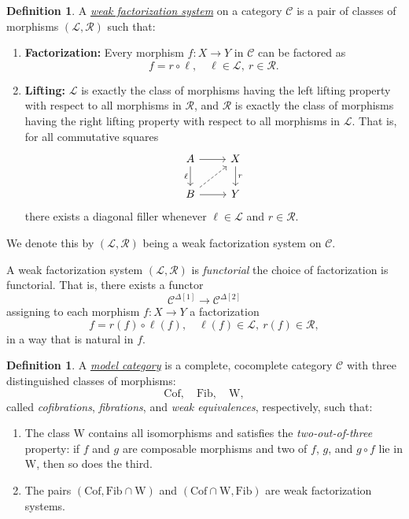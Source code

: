\documentclass[11pt]{article}
\theoremstyle{definition}
\newtheorem{definition}[theorem]{Definition}
\theoremstyle{remark}
\begin{document}
\begin{definition}
A \href{https://ncatlab.org/nlab/show/weak+factorization+system}{\emph{weak factorization system}}
on a category $\mathcal{C}$ is a pair of classes of morphisms 
$(\mathcal{L}, \mathcal{R})$ such that:
\begin{enumerate}
    \item \textbf{Factorization:} Every morphism $f: X \to Y$ in $\mathcal{C}$ can be factored as
    \[
        f = r \circ \ell, \quad \ell \in \mathcal{L},\ r \in \mathcal{R}.
    \]
    \item \textbf{Lifting:} $\mathcal{L}$ is exactly the class of morphisms having the left lifting property 
    with respect to all morphisms in $\mathcal{R}$, and $\mathcal{R}$ is exactly the class of morphisms having 
    the right lifting property with respect to all morphisms in $\mathcal{L}$.
    That is, for all commutative squares
    \[
    \begin{tikzcd}
    A \arrow[d, "\ell"'] \arrow[r] & X \arrow[d, "r"] \\
    B \arrow[r] \arrow[ru, dashed] & Y
    \end{tikzcd}
    \]
    there exists a diagonal filler whenever $\ell \in \mathcal{L}$ and $r \in \mathcal{R}$.
\end{enumerate}
We denote this by $(\mathcal{L},\mathcal{R})$ being a weak factorization system on $\mathcal{C}$.

A  weak factorization system $(\mathcal{L}, \mathcal{R})$ is \emph{functorial}
the choice of factorization is functorial. 
That is, there exists a functor
\[
\mathcal{C}^{\Delta[1]} \to \mathcal{C}^{\Delta[2]}
\]
assigning to each morphism $f: X \to Y$ a factorization
\[
f = r(f) \circ \ell(f), \quad \ell(f) \in \mathcal{L},\ r(f) \in \mathcal{R},
\]
in a way that is natural in $f$.
\end{definition}

\begin{definition}
A \href{https://ncatlab.org/nlab/show/model+category}{\emph{model category}} is
a complete, cocomplete category $\mathcal{C}$ with three distinguished classes of morphisms:
\[
\mathrm{Cof}, \quad \mathrm{Fib}, \quad \mathrm{W},
\]
called \emph{cofibrations}, \emph{fibrations}, and \emph{weak equivalences}, respectively, such that:

\begin{enumerate}
    \item The class $\mathrm{W}$ contains all isomorphisms and satisfies the \emph{two-out-of-three} property:  
    if $f$ and $g$ are composable morphisms and two of $f$, $g$, and $g \circ f$ lie in $\mathrm{W}$, then so does the third.

    \item The pairs $(\mathrm{Cof}, \mathrm{Fib} \cap \mathrm{W})$ and $(\mathrm{Cof} \cap \mathrm{W}, \mathrm{Fib})$
    are weak factorization systems.
\end{enumerate}

\end{definition}
\end{document}
